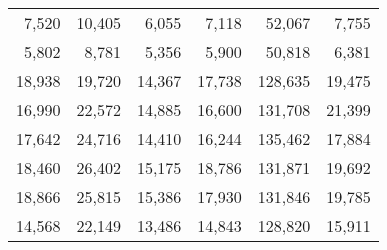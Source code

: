 \begin{table}[!ht]
\begin{tabular}{r rrrrr}
		7,520 & 10,405 & 6,055 & 7,118 & 52,067 & 7,755 \\
		5,802 & 8,781 & 5,356 & 5,900 & 50,818 & 6,381 \\
		\midrule
		18,938 & 19,720 & 14,367 & 17,738 & 128,635 & 19,475 \\
		16,990 & 22,572 & 14,885 & 16,600 & 131,708 & 21,399 \\
		17,642 & 24,716 & 14,410 & 16,244 & 135,462 & 17,884 \\
		18,460 & 26,402 & 15,175 & 18,786 & 131,871 & 19,692 \\
		18,866 & 25,815 & 15,386 & 17,930 & 131,846 & 19,785 \\
		14,568 & 22,149 & 13,486 & 14,843 & 128,820 & 15,911 \\
		\bottomrule
	\end{tabular}
\end{table}
\clearpage




